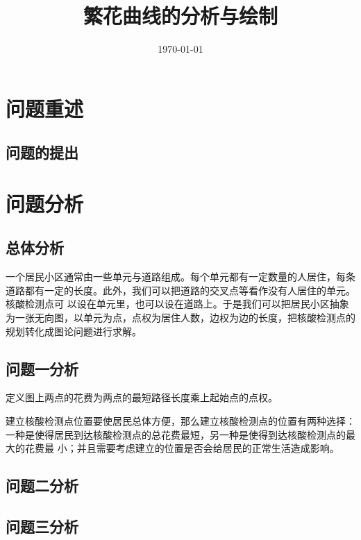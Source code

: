 \documentclass{cumcmthesis}
\title{繁花曲线的分析与绘制}
\date{\today}
\begin{document}
\maketitle

\begin{abstract}

\end{abstract}

\tableofcontents

\newpage
\section{问题重述}

\subsection{问题的提出}

\section{问题分析}

\subsection{总体分析}

一个居民小区通常由一些单元与道路组成。每个单元都有一定数量的人居住，每条道路都有一定的长度。此外，我们可以把道路的交叉点等看作没有人居住的单元。核酸检测点可
以设在单元里，也可以设在道路上。于是我们可以把居民小区抽象为一张无向图，以单元为点，点权为居住人数，边权为边的长度，把核酸检测点的规划转化成图论问题进行求解。

\subsection{问题一分析}

定义图上两点的花费为两点的最短路径长度乘上起始点的点权。

建立核酸检测点位置要使居民总体方便，那么建立核酸检测点的位置有两种选择：一种是使得居民到达核酸检测点的总花费最短，另一种是使得到达核酸检测点的最大的花费最
小；并且需要考虑建立的位置是否会给居民的正常生活造成影响。

\subsection{问题二分析}

\subsection{问题三分析}
\end{document}
